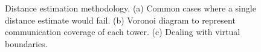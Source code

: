 \begin{figure}[h]
\centering
{}
\caption{Distance estimation methodology. 
(a) Common cases where a single distance estimate would fail.
(b) Voronoi diagram to represent communication coverage of each tower.
(c) Dealing with virtual boundaries.}
\end{figure}

